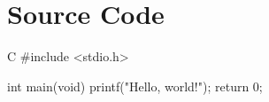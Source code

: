 \section{Source Code}


\begin{codebox}[title=hello.c]{C}
#include <stdio.h>

int main(void) {
    printf("Hello, world!\n");
    return 0;
}
\end{codebox}
